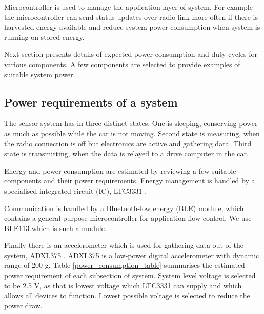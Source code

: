 Microcontroller is used to manage the application layer of system. For example the microcontroller can send status updates over radio link more often if there is harvested energy available and reduce system power consumption when system is running on stored energy.

Next section presents details of expected power consumption and duty cycles for various components. A few components are selected to provide examples of suitable system power.

\subsection{Power requirements of a system} \label{sect:power_requirement}
The sensor system has in three distinct states. One is sleeping, conserving power as much as possible while the car is not moving.
Second state is measuring, when the radio connection is off but electronics are active and gathering data.
Third state is transmitting, when the data is relayed to a drive computer in the car.

Energy and power consumption are estimated by reviewing a few suitable components and their power requirements. 
Energy management is handled by a specialised integrated circuit (IC), LTC3331 \cite{Technology}.

Communication is handled by a Bluetooth-low energy (BLE) module, which contains a general-purpose microcontroller for application flow control.
We use BLE113 \cite{Bluegiga2013} which is such a module.

Finally there is an accelerometer which is used for gathering data out of the system, ADXL375 \cite{ADXLDatasheet}. ADXL375 is a low-power digital accelerometer with dynamic range of 200 g. Table \ref{power_consumption_table}  summarises the estimated power requirement of each subsection of system. System level voltage is selected to be 2.5 V, as that is lowest voltage which LTC3331 can supply and which allows all devices to function. Lowest possible voltage is selected to reduce the power draw.

\begin{table}[htb]
\caption{\label{power_consumption_table} Current and power consumption of system at different activity levels. Power is calculated from current by multiplying current with 2.5 V.}
\begin{center}
\end{center}
\end{table}

